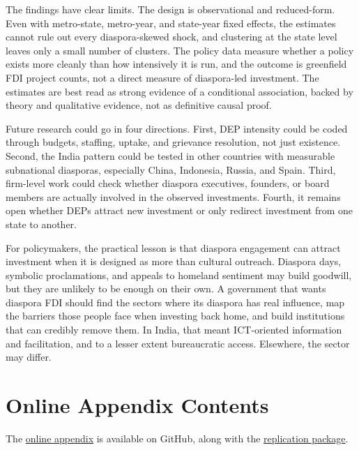 \documentclass[12pt]{article}
\begin{document}
The findings have clear limits. The design is observational and reduced-form. Even with metro-state, metro-year, and state-year fixed effects, the estimates cannot rule out every diaspora-skewed shock, and clustering at the state level leaves only a small number of clusters. The policy data measure whether a policy exists more cleanly than how intensively it is run, and the outcome is greenfield FDI project counts, not a direct measure of diaspora-led investment. The estimates are best read as strong evidence of a conditional association, backed by theory and qualitative evidence, not as definitive causal proof.

Future research could go in four directions. First, DEP intensity could be coded through budgets, staffing, uptake, and grievance resolution, not just existence. Second, the India pattern could be tested in other countries with measurable subnational diasporas, especially China, Indonesia, Russia, and Spain. Third, firm-level work could check whether diaspora executives, founders, or board members are actually involved in the observed investments. Fourth, it remains open whether DEPs attract new investment or only redirect investment from one state to another.

For policymakers, the practical lesson is that diaspora engagement can attract investment when it is designed as more than cultural outreach. Diaspora days, symbolic proclamations, and appeals to homeland sentiment may build goodwill, but they are unlikely to be enough on their own. A government that wants diaspora FDI should find the sectors where its diaspora has real influence, map the barriers those people face when investing back home, and build institutions that can credibly remove them. In India, that meant ICT-oriented information and facilitation, and to a lesser extent bureaucratic access. Elsewhere, the sector may differ.

\newpage
\printbibliography

\newpage
\section*{Online Appendix Contents}

\noindent The \href{\appendixurl}{online appendix} is available on GitHub, along with the \href{\repourl}{replication package}.
\end{document}
